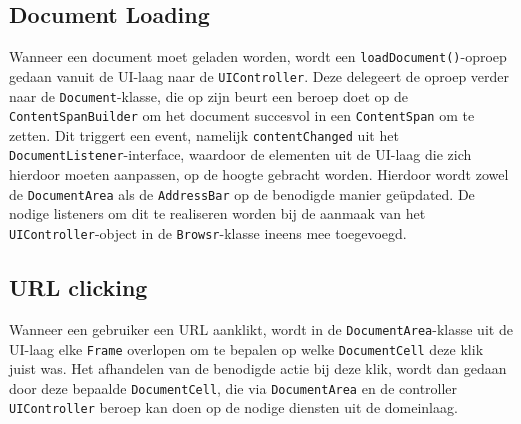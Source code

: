 \documentclass[12pt]{article}
\begin{document}
\subsection{Document Loading}
Wanneer een document moet geladen worden, wordt een \texttt{loadDocument()}-oproep gedaan vanuit de UI-laag naar de \texttt{UIController}. Deze delegeert de oproep verder naar de \texttt{Document}-klasse, die op zijn beurt een beroep doet op de \texttt{ContentSpanBuilder} om het document succesvol in een \texttt{ContentSpan} om te zetten. Dit triggert een event, namelijk \texttt{contentChanged} uit het \texttt{DocumentListener}-interface, waardoor de elementen uit de UI-laag die zich hierdoor moeten aanpassen, op de hoogte gebracht worden. Hierdoor wordt zowel de \texttt{DocumentArea} als de \texttt{AddressBar} op de benodigde manier geüpdated. De nodige listeners om dit te realiseren worden bij de aanmaak van het \texttt{UIController}-object in de \texttt{Browsr}-klasse ineens mee toegevoegd.

\subsection{URL clicking}
Wanneer een gebruiker een URL aanklikt, wordt in de \texttt{DocumentArea}-klasse uit de UI-laag elke \texttt{Frame} overlopen om te bepalen op welke \texttt{DocumentCell} deze klik juist was. Het afhandelen van de benodigde actie bij deze klik, wordt dan gedaan door deze bepaalde \texttt{DocumentCell}, die via \texttt{DocumentArea} en de controller \texttt{UIController} beroep kan doen op de nodige diensten uit de domeinlaag.
\end{document}
